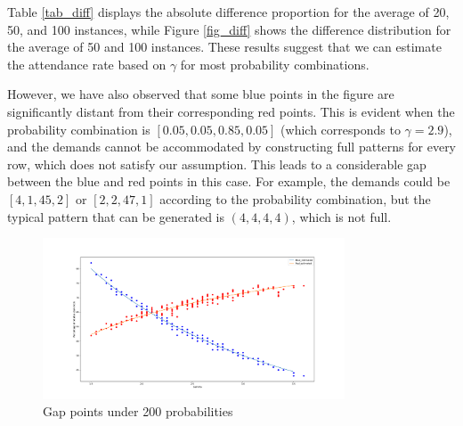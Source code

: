 Table \ref{tab_diff} displays the absolute difference proportion for the average of 20, 50, and 100 instances, while Figure \ref{fig_diff} shows the difference distribution for the average of 50 and 100 instances. These results suggest that we can estimate the attendance rate based on $\gamma$ for most probability combinations.

However, we have also observed that some blue points in the figure are significantly distant from their corresponding red points. This is evident when the probability combination is $[0.05, 0.05, 0.85, 0.05]$ (which corresponds to $\gamma = 2.9$), and the demands cannot be accommodated by constructing full patterns for every row, which does not satisfy our assumption. This leads to a considerable gap between the blue and red points in this case. For example, the demands could be $[4, 1, 45, 2]$ or $[2, 2, 47, 1]$ according to the probability combination, but the typical pattern that can be generated is $(4,4,4,4)$, which is not full.

\begin{figure}[ht]
  \centering
    \includegraphics[width=0.8\textwidth]{./Figures/gamma_estimation.pdf}
  \caption{Gap points under 200 probabilities}
\end{figure}


